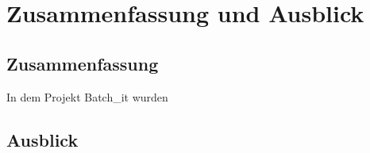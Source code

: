 

\chapter{Zusammenfassung und Ausblick} \label{chapter:conclusion}
\section{Zusammenfassung}
In dem Projekt Batch\_it wurden 
\section{Ausblick}